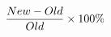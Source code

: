 \documentclass[preview]{standalone}
\begin{document}
\begin{align*}
\special{dvisvgm:raw <g id='unique000'>}\frac{New - Old}{Old} \times 100\%\special{dvisvgm:raw </g>}
\end{align*}
\end{document}
